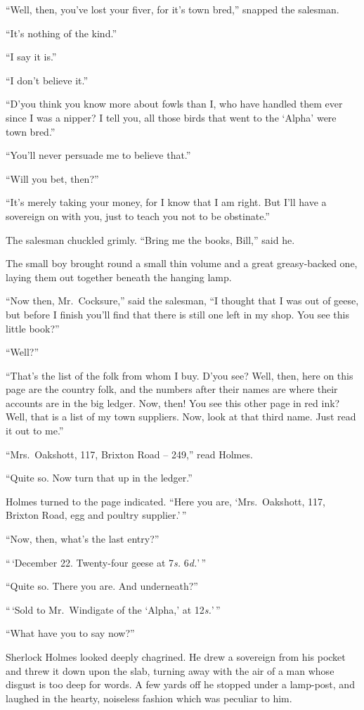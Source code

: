 “Well, then, you’ve lost your fiver, for it’s town bred,”
snapped the salesman.

“It’s nothing of the kind.”

“I say it is.”

“I don’t believe it.”

“D’you think you know more about fowls than I, who have
handled them ever since I was a nipper? I tell you, all those
birds that went to the ‘Alpha’ were town bred.”

“You’ll never persuade me to believe that.”

“Will you bet, then?”

“It’s merely taking your money, for I know that I am right.
But I’ll have a sovereign on with you, just to teach you not to
be obstinate.”

The salesman chuckled grimly. “Bring me the books,
Bill,” said he.

The small boy brought round a small thin volume and a
great greasy-backed one, laying them out together beneath
the hanging lamp.

“Now then, Mr.~Cocksure,” said the salesman, “I thought
that I was out of geese, but before I finish you’ll find that
there is still one left in my shop. You see this little book?”

“Well?”

“That’s the list of the folk from whom I buy. D’you see?
Well, then, here on this page are the country folk, and the
numbers after their names are where their accounts are in the
big ledger. Now, then! You see this other page in red ink?
Well, that is a list of my town suppliers. Now, look at that
third name. Just read it out to me.”

“Mrs.~Oakshott, 117, Brixton Road -- 249,” read Holmes.

“Quite so. Now turn that up in the ledger.”

Holmes turned to the page indicated. “Here you are,
‘Mrs.~Oakshott, 117, Brixton Road, egg and poultry
supplier.’\,”

“Now, then, what’s the last entry?”

“\,‘December 22. Twenty-four geese at 7\textit{s.} 6\textit{d.}’\,”

“Quite so. There you are. And underneath?”

“\,‘Sold to Mr.~Windigate of the ‘Alpha,’ at 12\textit{s.}’\,”

“What have you to say now?”

Sherlock Holmes looked deeply chagrined. He drew a
sovereign from his pocket and threw it down upon the slab,
turning away with the air of a man whose disgust is too deep
for words. A few yards off he stopped under a lamp-post,
and laughed in the hearty, noiseless fashion which was peculiar
to him.

